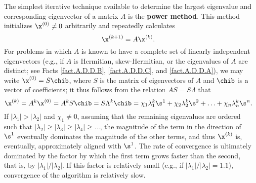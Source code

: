 The simplest iterative technique available to determine the
largest eigenvalue and corresponding eigenvector of a matrix $A$ is the {\bf power method}.
This method initializes $\x^{(0)}\ne 0$ arbitrarily
and repeatedly calculates
\begin{equation}
\x^{(k+1)}=A\x^{(k)}.\label{eq.powermethod}
\end{equation}
For problems in which $A$ is known to have
a complete set of linearly independent eigenvectors (e.g., if $A$ is Hermitian, skew-Hermitian, or the eigenvalues of $A$ are distinct; see
Facts \ref{fact.A.D.D.B}, \ref{fact.A.D.D.C}, and \ref{fact.A.D.D.A}), we may write $\x^{(0)}=S\chib$, where $S$ is the matrix
of eigenvectors of $A$ and $\chib$ is a vector of coefficients; it thus follows from the relation $AS=S\Lambda$ that
\begin{equation*}
\x^{(k)}=A^k \x^{(0)} = A^k S\chib=S\Lambda^k\chib = \chi_1 \lambda_1^k \s^1 + \chi_2 \lambda_2^k \s^2 + \ldots + \chi_n \lambda_n^k \s^n. 
\end{equation*}
If $|\lambda_1|>|\lambda_2|$ and $\chi_1\ne 0$, 
assuming that the remaining eigenvalues are ordered such that $|\lambda_2|\ge|\lambda_3|\ge|\lambda_4|\ge\ldots$,
the magnitude of the term in the direction of $\s^1$
eventually dominates the magnitude of the other terms, and thus $\x^{(k)}$ is, eventually, approximately aligned with $\s^1$.
The rate of convergence is ultimately dominated by the factor by which the 
first term grows faster than the second, that is, by $|\lambda_1|/|\lambda_2|$.
If this factor is relatively small (e.g., if $|\lambda_1|/|\lambda_2|=1.1$), convergence of the algorithm is relatively slow. 

